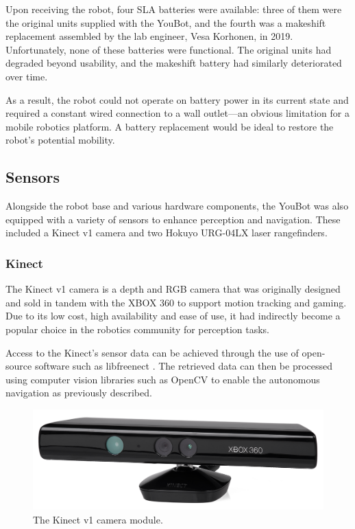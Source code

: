 \documentclass[a4paper, 12pt]{article}
\newif\ifshownotes
\newcommand{\notes}[1]{\ifshownotes\textcolor{blue}{#1}\fi}
\begin{document}
    Upon receiving the robot, four SLA batteries were available: three of them were the original units supplied with the YouBot, and the fourth was a makeshift replacement assembled by the lab engineer, Vesa Korhonen, in 2019. Unfortunately, none of these batteries were functional. The original units had degraded beyond usability, and the makeshift battery had similarly deteriorated over time.

    As a result, the robot could not operate on battery power in its current state and required a constant wired connection to a wall outlet—an obvious limitation for a mobile robotics platform. A battery replacement would be ideal to restore the robot's potential mobility. 

    \subsection{Sensors}
    
    Alongside the robot base and various hardware components, the YouBot was also equipped with a variety of sensors to enhance perception and navigation. These included a Kinect v1 camera and two Hokuyo URG-04LX laser rangefinders. 

    \subsubsection{Kinect}  

    The Kinect v1 camera is a depth and RGB camera that was originally designed and sold in tandem with the XBOX 360 to support motion tracking and gaming. Due to its low cost, high availability and ease of use, it had indirectly become a popular choice in the robotics community for perception tasks. 

    Access to the Kinect's sensor data can be achieved through the use of open-source software such as libfreenect \notes{[cite]}. The retrieved data can then be processed using computer vision libraries such as OpenCV to enable the autonomous navigation as previously described. 

    \begin{figure}[ht]
        \centering
        \includegraphics[width=0.5\linewidth]{images/sec2/kinectv1.png}
        \caption{The Kinect v1 camera module.}
    \end{figure}
\end{document}
